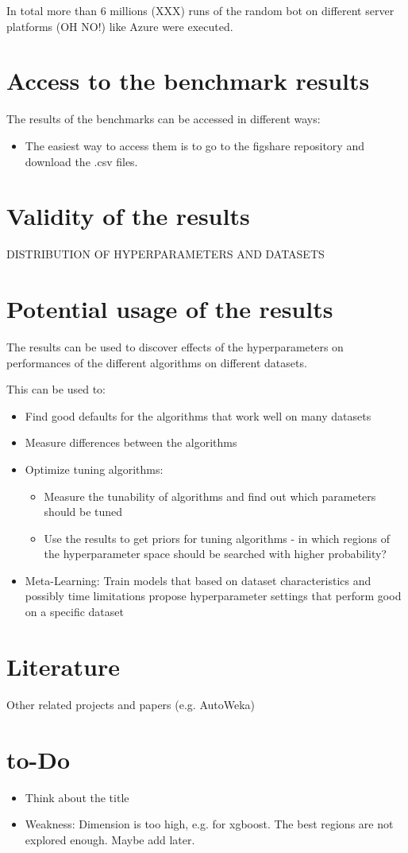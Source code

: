 \documentclass{article}
\begin{document}
In total more than 6 millions (XXX) runs of the random bot on different 
server platforms (OH NO!) like Azure were executed.

\section{Access to the benchmark results}

The results of the benchmarks can be accessed in different ways:

\begin{itemize}
\item The easiest way to access them is to go to the figshare repository \citep{Probst2017} and
download the .csv files. 
\end{itemize}

\section{Validity of the results}

DISTRIBUTION OF HYPERPARAMETERS AND DATASETS

\section{Potential usage of the results}

The results can be used to discover effects of the hyperparameters on performances 
of the different algorithms on different datasets. 

This can be used to:
\begin{itemize}
\item Find good defaults for the algorithms that work well on many datasets
\item Measure differences between the algorithms
\item Optimize tuning algorithms:
\begin{itemize}
\item Measure the tunability of algorithms and find out which parameters should be tuned
\item Use the results to get priors for tuning algorithms - in which regions of the 
hyperparameter space should be searched with higher probability?
\end{itemize}
\item Meta-Learning: Train models that based on dataset characteristics and 
possibly time limitations propose hyperparameter settings that perform good 
on a specific dataset
\end{itemize}

\section{Literature}
Other related projects and papers (e.g. AutoWeka)

\section{to-Do}
\begin{itemize}
\item Think about the title
\item Weakness: Dimension is too high, e.g. for xgboost. The best regions are not explored enough. 
Maybe add later. 
\end{itemize}


 
\end{document}
